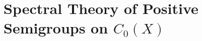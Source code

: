 \setcounter{chapter}{2}
\chapter{Spectral Theory of Positive Semigroups on \texorpdfstring{$C_{0}(X)$}{C_0(X)}}\label{chap:b3}

